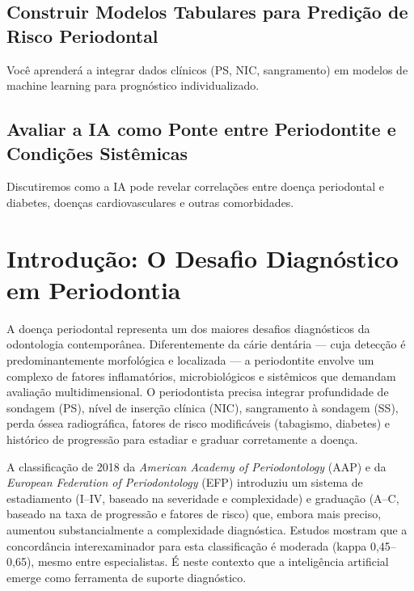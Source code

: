 \subsection{Construir Modelos Tabulares para Predição de Risco Periodontal}
Você aprenderá a integrar dados clínicos (PS, NIC, sangramento) em modelos de machine learning para prognóstico individualizado.

\subsection{Avaliar a IA como Ponte entre Periodontite e Condições Sistêmicas}
Discutiremos como a IA pode revelar correlações entre doença periodontal e diabetes, doenças cardiovasculares e outras comorbidades.

\section{Introdução: O Desafio Diagnóstico em Periodontia}

A doença periodontal representa um dos maiores desafios diagnósticos da odontologia contemporânea. Diferentemente da cárie dentária --- cuja detecção é predominantemente morfológica e localizada --- a periodontite envolve um complexo de fatores inflamatórios, microbiológicos e sistêmicos que demandam avaliação multidimensional. O periodontista precisa integrar profundidade de sondagem (PS), nível de inserção clínica (NIC), sangramento à sondagem (SS), perda óssea radiográfica, fatores de risco modificáveis (tabagismo, diabetes) e histórico de progressão para estadiar e graduar corretamente a doença.

A classificação de 2018 da \textit{American Academy of Periodontology} (AAP) e da \textit{European Federation of Periodontology} (EFP) introduziu um sistema de estadiamento (I--IV, baseado na severidade e complexidade) e graduação (A--C, baseado na taxa de progressão e fatores de risco) que, embora mais preciso, aumentou substancialmente a complexidade diagnóstica. Estudos mostram que a concordância interexaminador para esta classificação é moderada (kappa 0,45--0,65), mesmo entre especialistas. É neste contexto que a inteligência artificial emerge como ferramenta de suporte diagnóstico.


